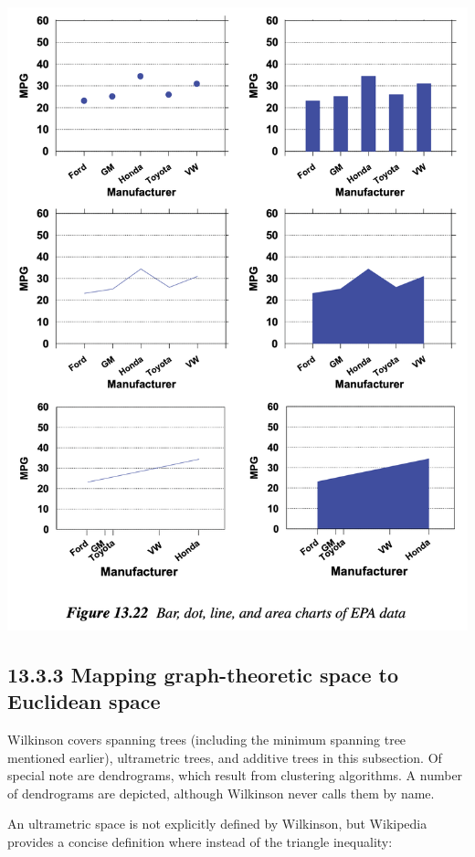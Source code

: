 \includegraphics{fiEPAdata.png}

\hypertarget{mapping-graph-theoretic-space-to-euclidean-space}{%
\subsection{13.3.3 Mapping graph-theoretic space to Euclidean
space}\label{mapping-graph-theoretic-space-to-euclidean-space}}

Wilkinson covers spanning trees (including the minimum spanning tree
mentioned earlier), ultrametric trees, and additive trees in this
subsection. Of special note are dendrograms, which result from
clustering algorithms. A number of dendrograms are depicted, although
Wilkinson never calls them by name.

An ultrametric space is not explicitly defined by Wilkinson, but
Wikipedia provides a concise definition where instead of the triangle
inequality:

